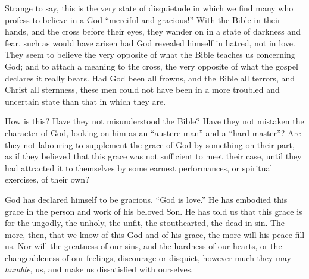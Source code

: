 \documentclass[
]{book}
\begin{document}
Strange to say, this is the very state of disquietude in which we find many who profess to believe in a God ``merciful and gracious!'' With the Bible in their hands, and the cross before their eyes, they wander on in a state of darkness and fear, such as would have arisen had God revealed himself in hatred, not in love. They seem to believe the very opposite of what the Bible teaches us concerning God; and to attach a meaning to the cross, the very opposite of what the gospel declares it really bears. Had God been all frowns, and the Bible all terrors, and Christ all sternness, these men could not have been in a more troubled and uncertain state than that in which they are.

How is this? Have they not misunderstood the Bible? Have they not mistaken the character of God, looking on him as an ``austere man'' and a ``hard master''? Are they not labouring to supplement the grace of God by something on their part, as if they believed that this grace was not sufficient to meet their case, until they had attracted it to themselves by some earnest performances, or spiritual exercises, of their own?

God has declared himself to be gracious. ``God is love.'' He has embodied this grace in the person and work of his beloved Son. He has told us that this grace is for the ungodly, the unholy, the unfit, the stouthearted, the dead in sin. The more, then, that we know of this God and of his grace, the more will his peace fill us. Nor will the greatness of our sins, and the hardness of our hearts, or the changeableness of our feelings, discourage or disquiet, however much they may \emph{humble}, us, and make us dissatisfied with ourselves.
\end{document}
